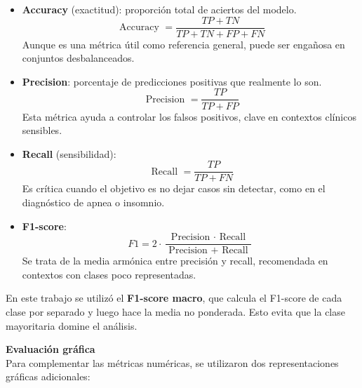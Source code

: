 \begin{itemize}
    \item \textbf{Accuracy} (exactitud): proporción total de aciertos del modelo.
    \begin{equation}
        \text { Accuracy }=\frac{TP+TN}{TP+TN+FP+FN}
    \end{equation}
    Aunque es una métrica útil como referencia general, puede ser engañosa en conjuntos desbalanceados.

    \item \textbf{Precision}: porcentaje de predicciones positivas que realmente lo son.
    \begin{equation}
        \text { Precision }=\frac{TP}{TP+FP}
    \end{equation}
    Esta métrica ayuda a controlar los falsos positivos, clave en contextos clínicos sensibles.

    \item \textbf{Recall} (sensibilidad):
    \begin{equation}
        \text { Recall }=\frac{TP}{TP + FN}
    \end{equation}
    Es crítica cuando el objetivo es no dejar casos sin detectar, como en el diagnóstico de apnea o insomnio.

    \item \textbf{F1-score}:
    \begin{equation}
        F1 = 2 \cdot \frac{\text { Precision } \cdot \text { Recall }}  {\text { Precision }+ \text { Recall }}
    \end{equation}
    Se trata de la media armónica entre precisión y recall, recomendada en contextos con clases poco representadas.

\end{itemize}

En este trabajo se utilizó el \textbf{F1-score macro}, que calcula el F1-score de cada clase por separado y luego hace la media no ponderada. Esto evita que la clase mayoritaria domine el análisis.

\textbf{Evaluación gráfica}\\

Para complementar las métricas numéricas, se utilizaron dos representaciones gráficas adicionales:

